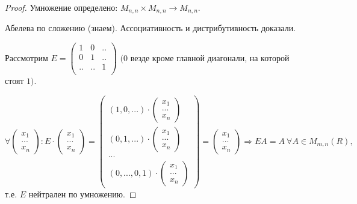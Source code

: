 \begin{proof}
    Умножение определено: $M_{n,n}\times M_{n,n}\rightarrow M_{n,n}$. 
    
    Абелева по сложению (знаем). Ассоциативность и дистрибутивность 
доказали. 
    
    Рассмотрим $E=\begin{pmatrix} 1 &0 &..\\ 0 &1 &.. \\ ..&.. &1\\ 
\end{pmatrix}$ $(0$ везде кроме главной диагонали, на которой стоят $1)$. 
    
    $\forall \begin{pmatrix} x_1\\ ...  \\ x_n 
\end{pmatrix}:E\cdot\begin{pmatrix} x_1\\ ...  \\ x_n 
\end{pmatrix}=\begin{pmatrix} (1,0,...)\cdot \begin{pmatrix} x_1\\ ...  \\ 
x_n \end{pmatrix}\\(0,1,...)\cdot \begin{pmatrix} x_1\\ ...  \\ x_n 
\end{pmatrix}\\ ...  \\ (0,..., 0, 1)\cdot \begin{pmatrix} x_1\\ ...  \\ 
x_n \end{pmatrix} \end{pmatrix}=\begin{pmatrix} x_1\\ ...  \\ x_n 
\end{pmatrix}\Rightarrow EA=A\ \forall A\in M_{m,n}(R),$ т.е. $E$ 
нейтрален по умножению.
\end{proof}

